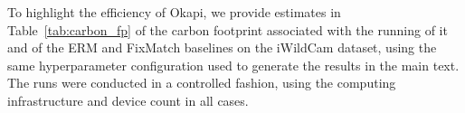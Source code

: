 To highlight the efficiency of Okapi, we provide estimates in Table~\ref{tab:carbon_fp} of the
carbon footprint associated with the running of it and of the ERM and FixMatch baselines on the
iWildCam dataset, using the same hyperparameter configuration used to generate the results in the
main text. The runs were conducted in a controlled fashion, using the computing infrastructure and
device count in all cases.

\begin{table}[htp]
	\centering
	\caption{
	  Comparison of the estimated carbon footprint (kgCoeq) of Okapi with the ERM and FixMatch
	  baselines per replicate of the iWildCam dataset. For the controlled training conducted to
	  enable fair computation of these estimates, we used a private infrastructure with an
	  estimated carbon efficiency of 0.432 kgCOeq/kWh and RTX 3090 GPUs, each job being run on
	  a single GPU, coupled with four data-loading workers.
	}
	\label{tab:carbon_fp}
\end{table}
